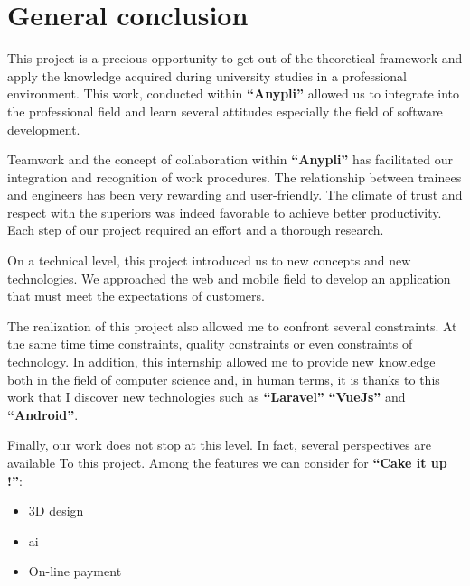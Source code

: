 \documentclass[12pt,a4paper]{report}
\begin{document}
	\chapter*{\centering General conclusion}
	This project is a precious opportunity to get out of the theoretical framework and apply the knowledge acquired during university studies in a professional environment. This work, conducted within \textbf{``Anypli''} allowed us to integrate into the professional field and learn several attitudes especially the field of software development.\par 
	Teamwork and the concept of collaboration within  \textbf{``Anypli''} has facilitated our integration and recognition of work procedures. The relationship between trainees and engineers has been very rewarding and user-friendly. The climate of trust and respect with the superiors was indeed favorable to achieve better productivity. Each step of our project required an effort and a thorough research.\par 
	On a technical level, this project introduced us to new concepts and new technologies. We approached the web and mobile field to develop an application that must meet the expectations of customers.\par 
	The realization of this project also allowed me to confront several constraints. At the same time time constraints, quality constraints or even constraints of technology. In addition, this internship allowed me to provide new knowledge both in the field of computer science and, in human terms, it is thanks to this work that I discover new technologies such as \textbf{``Laravel''} \textbf{``VueJs''} and \textbf{``Android''}.\par 
	Finally, our work does not stop at this level. In fact, several perspectives are available
	To this project.
	Among the features we can consider for \textbf{``Cake it up !''}:
	\begin{itemize}
		\item 3D design 
		\item \ac{ai}
		\item On-line payment
		
	\end{itemize}
	
	
	\clearpage
	
	
	
	
	
	
	
	
	
	
\end{document}
